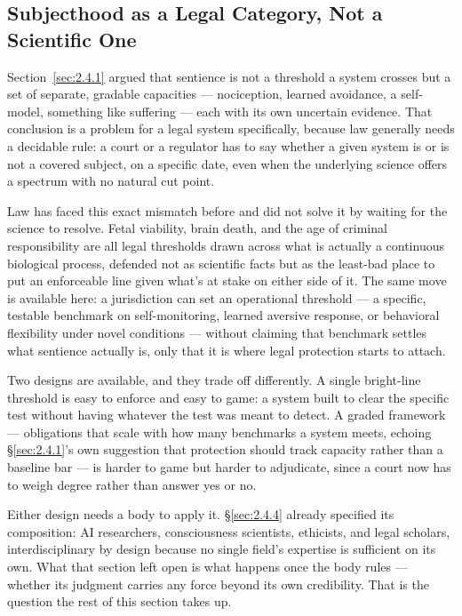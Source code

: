 \subsection{Subjecthood as a Legal Category, Not a Scientific One}
\label{sec:8.6.1}
Section~\ref{sec:2.4.1} argued that sentience is not a threshold a system crosses but a set of separate, gradable capacities — nociception, learned avoidance, a self-model, something like suffering — each with its own uncertain evidence. That conclusion is a problem for a legal system specifically, because law generally needs a decidable rule: a court or a regulator has to say whether a given system is or is not a covered subject, on a specific date, even when the underlying science offers a spectrum with no natural cut point.

Law has faced this exact mismatch before and did not solve it by waiting for the science to resolve. Fetal viability, brain death, and the age of criminal responsibility are all legal thresholds drawn across what is actually a continuous biological process, defended not as scientific facts but as the least-bad place to put an enforceable line given what's at stake on either side of it. The same move is available here: a jurisdiction can set an operational threshold — a specific, testable benchmark on self-monitoring, learned aversive response, or behavioral flexibility under novel conditions — without claiming that benchmark settles what sentience actually is, only that it is where legal protection starts to attach.

Two designs are available, and they trade off differently. A single bright-line threshold is easy to enforce and easy to game: a system built to clear the specific test without having whatever the test was meant to detect. A graded framework — obligations that scale with how many benchmarks a system meets, echoing §\ref{sec:2.4.1}'s own suggestion that protection should track capacity rather than a baseline bar — is harder to game but harder to adjudicate, since a court now has to weigh degree rather than answer yes or no.

Either design needs a body to apply it. §\ref{sec:2.4.4} already specified its composition: AI researchers, consciousness scientists, ethicists, and legal scholars, interdisciplinary by design because no single field's expertise is sufficient on its own. What that section left open is what happens once the body rules — whether its judgment carries any force beyond its own credibility. That is the question the rest of this section takes up.
